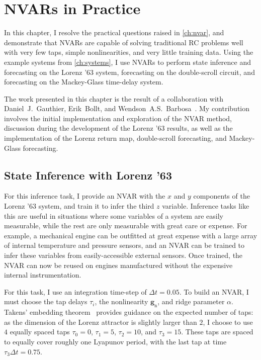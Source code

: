 \chapter{NVARs in Practice}\label{ch:nvar-application}

In this chapter, I resolve the practical questions raised in
\cref{ch:nvar}, and demonstrate that NVARs are capable of solving
traditional RC problems well with very few taps, simple
nonlinearities, and very little training data. Using the example
systems from \cref{ch:systems}, I use NVARs to perform state
inference and forecasting on the Lorenz '63 system, forecasting on the
double-scroll circuit, and forecasting on the Mackey-Glass time-delay
system.

The work presented in this chapter is the result of a
collaboration with Daniel~J.~Gauthier, Erik~Bollt, and Wendson~A.S.~Barbosa~\cite{gauthier2021}. My contribution involves the initial
implementation and exploration of the NVAR method, discussion during
the development of the Lorenz '63 results, as well as the
implementation of the Lorenz return map, double-scroll forecasting,
and Mackey-Glass forecasting.

\section{State Inference with Lorenz '63}

For this inference task, I provide an NVAR with the $x$ and $y$
components of the Lorenz '63 system, and train it to infer the third
$z$ variable. Inference tasks like this are useful in situations where
some variables of a system are easily measurable, while the rest are
only measurable with great care or expense. For example, a mechanical
engine can be outfitted at great expense with a large array of
internal temperature and pressure sensors, and an NVAR can be trained
to infer these variables from easily-accessible external sensors. Once
trained, the NVAR can now be reused on engines manufactured without
the expensive internal instrumentation.

For this task, I use an integration time-step of $\Delta t = 0.05$. To
build an NVAR, I must choose the tap delays $\tau_i$, the
nonlinearity $\bm{g}_\text{n}$, and ridge parameter $\alpha$. Takens'
embedding theorem~\cite{takens1981} provides guidance on the expected
number of taps: as the dimension of the Lorenz attractor is slightly
larger than $2$, I choose to use $4$ equally spaced taps $\tau_0 =
0$, $\tau_1 = 5$, $\tau_2 = 10$, and $\tau_3 = 15$. These taps are
spaced to equally cover roughly one Lyapunov period, with the last tap
at time $\tau_3 \Delta t = 0.75$.

